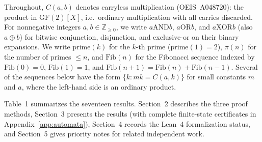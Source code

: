 \documentclass[11pt]{article}
\begin{document}
Throughout, $C(a,b)$ denotes carryless multiplication (OEIS~A048720): the product in $\mathrm{GF}(2)[X]$, i.e.\ ordinary multiplication with all carries discarded. For nonnegative integers $a,b \in \mathbb{Z}_{\ge 0}$, we write $a \mathbin{\mathrm{AND}} b$, $a \mathbin{\mathrm{OR}} b$, and $a \mathbin{\mathrm{XOR}} b$ (also $a \oplus b$) for bitwise conjunction, disjunction, and exclusive-or on their binary expansions. We write $\mathrm{prime}(k)$ for the $k$-th prime ($\mathrm{prime}(1) = 2$), $\pi(n)$ for the number of primes $\le n$, and $\mathrm{Fib}(n)$ for the Fibonacci sequence indexed by $\mathrm{Fib}(0) = 0$, $\mathrm{Fib}(1) = 1$, and $\mathrm{Fib}(n+1) = \mathrm{Fib}(n) + \mathrm{Fib}(n-1)$. Several of the sequences below have the form $\{k : mk = C(a,k)\}$ for small constants $m$ and $a$, where the left-hand side is an ordinary product.

Table~1 summarizes the seventeen results. Section~2 describes the three proof methods, Section~3 presents the results (with complete finite-state certificates in Appendix~\ref{app:automata}), Section~4 records the Lean~4 formalization status, and Section~5 gives priority notes for related independent work.
\end{document}
